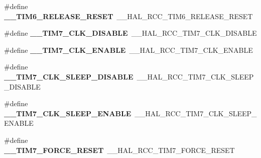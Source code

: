 \begin{DoxyCompactItemize}
\item 
\hypertarget{group___h_a_l___r_c_c___aliased_gabdf7ef03c9de1208b413d09be54bbac7}{\#define {\bfseries \-\_\-\-\_\-\-T\-I\-M6\-\_\-\-R\-E\-L\-E\-A\-S\-E\-\_\-\-R\-E\-S\-E\-T}~\-\_\-\-\_\-\-H\-A\-L\-\_\-\-R\-C\-C\-\_\-\-T\-I\-M6\-\_\-\-R\-E\-L\-E\-A\-S\-E\-\_\-\-R\-E\-S\-E\-T}\label{group___h_a_l___r_c_c___aliased_gabdf7ef03c9de1208b413d09be54bbac7}

\item 
\hypertarget{group___h_a_l___r_c_c___aliased_ga51e8c84a72ecac4490fa36cffd5e05b1}{\#define {\bfseries \-\_\-\-\_\-\-T\-I\-M7\-\_\-\-C\-L\-K\-\_\-\-D\-I\-S\-A\-B\-L\-E}~\-\_\-\-\_\-\-H\-A\-L\-\_\-\-R\-C\-C\-\_\-\-T\-I\-M7\-\_\-\-C\-L\-K\-\_\-\-D\-I\-S\-A\-B\-L\-E}\label{group___h_a_l___r_c_c___aliased_ga51e8c84a72ecac4490fa36cffd5e05b1}

\item 
\hypertarget{group___h_a_l___r_c_c___aliased_gabbecf6d3f327c8dbd1047470bb578a0a}{\#define {\bfseries \-\_\-\-\_\-\-T\-I\-M7\-\_\-\-C\-L\-K\-\_\-\-E\-N\-A\-B\-L\-E}~\-\_\-\-\_\-\-H\-A\-L\-\_\-\-R\-C\-C\-\_\-\-T\-I\-M7\-\_\-\-C\-L\-K\-\_\-\-E\-N\-A\-B\-L\-E}\label{group___h_a_l___r_c_c___aliased_gabbecf6d3f327c8dbd1047470bb578a0a}

\item 
\hypertarget{group___h_a_l___r_c_c___aliased_ga4c16bf990b994cdc00d0d4802c5d234a}{\#define {\bfseries \-\_\-\-\_\-\-T\-I\-M7\-\_\-\-C\-L\-K\-\_\-\-S\-L\-E\-E\-P\-\_\-\-D\-I\-S\-A\-B\-L\-E}~\-\_\-\-\_\-\-H\-A\-L\-\_\-\-R\-C\-C\-\_\-\-T\-I\-M7\-\_\-\-C\-L\-K\-\_\-\-S\-L\-E\-E\-P\-\_\-\-D\-I\-S\-A\-B\-L\-E}\label{group___h_a_l___r_c_c___aliased_ga4c16bf990b994cdc00d0d4802c5d234a}

\item 
\hypertarget{group___h_a_l___r_c_c___aliased_ga96f4fdc9e740dc843f6b31f82441f097}{\#define {\bfseries \-\_\-\-\_\-\-T\-I\-M7\-\_\-\-C\-L\-K\-\_\-\-S\-L\-E\-E\-P\-\_\-\-E\-N\-A\-B\-L\-E}~\-\_\-\-\_\-\-H\-A\-L\-\_\-\-R\-C\-C\-\_\-\-T\-I\-M7\-\_\-\-C\-L\-K\-\_\-\-S\-L\-E\-E\-P\-\_\-\-E\-N\-A\-B\-L\-E}\label{group___h_a_l___r_c_c___aliased_ga96f4fdc9e740dc843f6b31f82441f097}

\item 
\hypertarget{group___h_a_l___r_c_c___aliased_ga63998a20f793d6defe0441970e8af993}{\#define {\bfseries \-\_\-\-\_\-\-T\-I\-M7\-\_\-\-F\-O\-R\-C\-E\-\_\-\-R\-E\-S\-E\-T}~\-\_\-\-\_\-\-H\-A\-L\-\_\-\-R\-C\-C\-\_\-\-T\-I\-M7\-\_\-\-F\-O\-R\-C\-E\-\_\-\-R\-E\-S\-E\-T}\label{group___h_a_l___r_c_c___aliased_ga63998a20f793d6defe0441970e8af993}


\end{DoxyCompactItemize}
